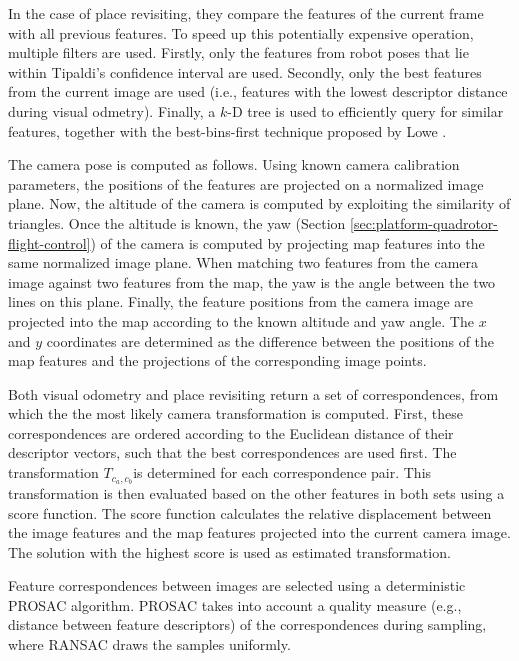 In the case of place revisiting, they compare the features of the current frame with all previous features.
To speed up this potentially expensive operation, multiple filters are used.
Firstly, only the features from robot poses that lie within Tipaldi's confidence interval \cite{tipaldi2007approximate} are used.
Secondly, only the best features from the current image are used (i.e., features with the lowest descriptor distance during visual odmetry).
Finally, a $k$-D tree is used to efficiently query for similar features, together with the best-bins-first technique proposed by Lowe \cite{lowe1999object}.

The camera pose is computed as follows.
Using known camera calibration parameters, the positions of the features are projected on a normalized image plane.
Now, the altitude of the camera is computed by exploiting the similarity of triangles.
Once the altitude is known, the yaw (Section \ref{sec:platform-quadrotor-flight-control}) of the camera is computed by projecting map features 
into the same normalized image plane.
When matching two features from the camera image against two features from the map, the yaw is the angle between the two  lines on this plane.
Finally, the feature positions from the camera image are projected into the map according to the known altitude and yaw angle.
The $x$ and $y$ coordinates are determined as the difference between the positions of the map features and the projections of the corresponding image points.

Both visual odometry and place revisiting return a set of correspondences, from which the the most likely camera transformation is computed.
First, these correspondences are ordered according to the Euclidean distance of their descriptor vectors, such that the best correspondences are used first.
The transformation $T_{c_a,c_b}$is determined for each correspondence pair.
This transformation is then evaluated based on the other features in both sets using a score function.
The score function calculates the relative displacement between the image features and the map features projected into the current camera image.
The solution with the highest score is used as estimated transformation.

Feature correspondences between images are selected using a deterministic PROSAC \cite{chum2005matching} algorithm.
PROSAC takes into account a quality measure (e.g., distance between feature descriptors) of the correspondences during sampling, where RANSAC draws the samples uniformly.


